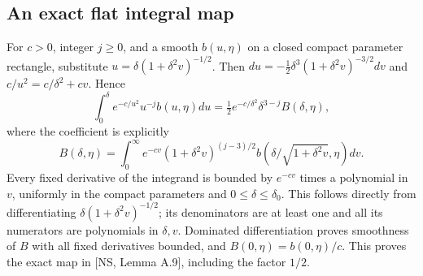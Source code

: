 \documentclass[10pt,a4paper]{article}
\begin{document}
\subsection{An exact flat integral map}
For $c>0$, integer $j\ge0$, and a smooth $b(u,\eta)$ on a closed compact
parameter rectangle, substitute $u=\delta(1+\delta^2v)^{-1/2}$.
Then $du=-\tfrac12\delta^3(1+\delta^2v)^{-3/2}dv$ and
$c/u^2=c/\delta^2+cv$. Hence
\begin{equation}\label{pa:eq:flat}\tag{PA.FLAT}
\int_0^\delta e^{-c/u^2}u^{-j}b(u,\eta)du
=\tfrac12e^{-c/\delta^2}\delta^{3-j}B(\delta,\eta),
\end{equation}
where the coefficient is explicitly
\[
B(\delta,\eta)=\int_0^\infty e^{-cv}(1+\delta^2v)^{(j-3)/2}
b(\delta/\sqrt{1+\delta^2v},\eta)dv.
\]
Every fixed derivative of the integrand is bounded by $e^{-cv}$ times a
polynomial in $v$, uniformly in the compact parameters and $0\le\delta\le\delta_0$.
This follows directly from differentiating $\delta(1+\delta^2v)^{-1/2}$;
its denominators are at least one and all its numerators are polynomials in
$\delta,v$. Dominated differentiation proves smoothness of $B$ with all
fixed derivatives bounded, and $B(0,\eta)=b(0,\eta)/c$.
This proves the exact map in [NS, Lemma A.9], including the factor $1/2$.
\end{document}
